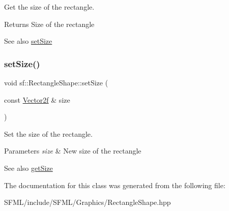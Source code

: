 Get the size of the rectangle. 

\begin{DoxyReturn}{Returns}
Size of the rectangle
\end{DoxyReturn}
\begin{DoxySeeAlso}{See also}
\mbox{\hyperlink{classsf_1_1_rectangle_shape_a5c65d374d4a259dfdc24efdd24a5dbec}{set\+Size}} \begin{DoxyVerb}\end{DoxyVerb}
 
\end{DoxySeeAlso}
\mbox{\label{classsf_1_1_rectangle_shape_a5c65d374d4a259dfdc24efdd24a5dbec}} 
\subsubsection{\texorpdfstring{setSize()}{setSize()}}
{\footnotesize\ttfamily void sf\+::\+Rectangle\+Shape\+::set\+Size (\begin{DoxyParamCaption}\item[{const \mbox{\hyperlink{classsf_1_1_vector2}{Vector2f}} \&}]{size }\end{DoxyParamCaption})}



Set the size of the rectangle. 


\begin{DoxyParams}{Parameters}
{\em size} & New size of the rectangle\\
\hline
\end{DoxyParams}
\begin{DoxySeeAlso}{See also}
\mbox{\hyperlink{classsf_1_1_rectangle_shape_ae54a07ff5537bf76de6748f592b34896}{get\+Size}} \begin{DoxyVerb}\end{DoxyVerb}
 
\end{DoxySeeAlso}


The documentation for this class was generated from the following file\+:\begin{DoxyCompactItemize}
\item 
S\+F\+M\+L/include/\+S\+F\+M\+L/\+Graphics/Rectangle\+Shape.\+hpp\end{DoxyCompactItemize}
